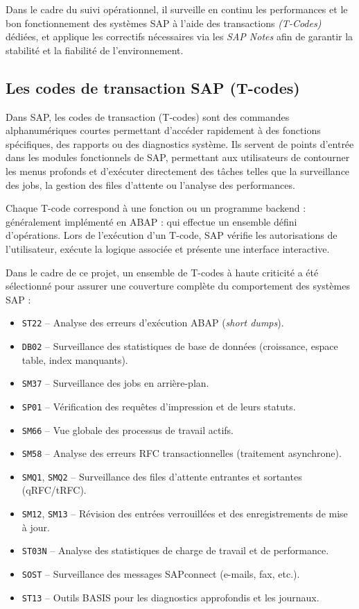 Dans le cadre du suivi opérationnel, il surveille en continu les performances et le bon fonctionnement des systèmes SAP à l'aide des transactions \textit{(T-Codes)} dédiées, et applique les correctifs nécessaires via les \textit{SAP Notes} afin de garantir la stabilité et la fiabilité de l'environnement.

\subsection{Les codes de transaction SAP (T-codes)}

Dans SAP, les codes de transaction (T-codes) sont des commandes alphanumériques courtes
permettant d'accéder rapidement à des fonctions spécifiques, des rapports ou des
diagnostics système. Ils servent de points d'entrée dans les modules fonctionnels de SAP,
permettant aux utilisateurs de contourner les menus profonds et d'exécuter directement
des tâches telles que la surveillance des jobs, la gestion des files d'attente ou
l'analyse des performances.

Chaque T-code correspond à une fonction ou un programme backend : généralement implémenté
en ABAP : qui effectue un ensemble défini d'opérations. Lors de l'exécution d'un T-code,
SAP vérifie les autorisations de l'utilisateur, exécute la logique associée et présente
une interface interactive.

Dans le cadre de ce projet, un ensemble de T-codes à haute criticité a été sélectionné
pour assurer une couverture complète du comportement des systèmes SAP :

\begin{itemize}[leftmargin=*, label=\textbullet]
  \item \texttt{ST22} – Analyse des erreurs d'exécution ABAP (\textit{short dumps}).
  \item \texttt{DB02} – Surveillance des statistiques de base de données (croissance,
        espace table, index manquants).
  \item \texttt{SM37} – Surveillance des jobs en arrière-plan.
  \item \texttt{SP01} – Vérification des requêtes d'impression et de leurs statuts.
  \item \texttt{SM66} – Vue globale des processus de travail actifs.
  \item \texttt{SM58} – Analyse des erreurs RFC transactionnelles (traitement asynchrone).
  \item \texttt{SMQ1}, \texttt{SMQ2} – Surveillance des files d'attente entrantes et
        sortantes (qRFC/tRFC).
  \item \texttt{SM12}, \texttt{SM13} – Révision des entrées verrouillées et des
        enregistrements de mise à jour.
  \item \texttt{ST03N} – Analyse des statistiques de charge de travail et de performance.
  \item \texttt{SOST} – Surveillance des messages SAPconnect (e-mails, fax, etc.).
  \item \texttt{ST13} – Outils BASIS pour les diagnostics approfondis et les journaux.
\end{itemize}

